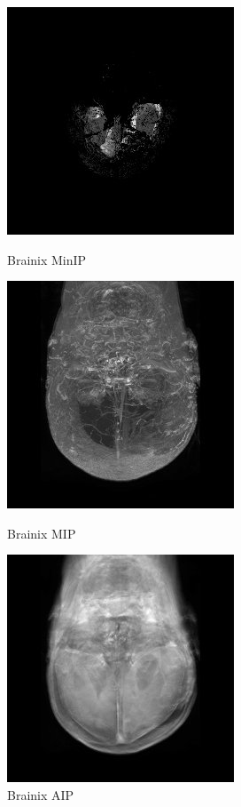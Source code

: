 \documentclass[a4paper,11pt]{article}
\begin{document}
\begin{figure}[!h]
	\begin{minipage}[c]{.22\linewidth}
     \center
	\includegraphics[scale=0.5]{brainix_MinIP.jpg}
	\caption{Brainix MinIP}
   \end{minipage} \hfill
	\begin{minipage}[c]{.22\linewidth}
      \center
	\includegraphics[scale=0.5]{brainix_MIP.jpg}
	\caption{Brainix MIP}
   \end{minipage} \hfill
   \begin{minipage}[c]{.22\linewidth}
      \center
	\includegraphics[scale=0.5]{brainix_AIP.jpg}
	\caption{Brainix AIP}
   \end{minipage} \hfill
\end{figure}
\end{document}
